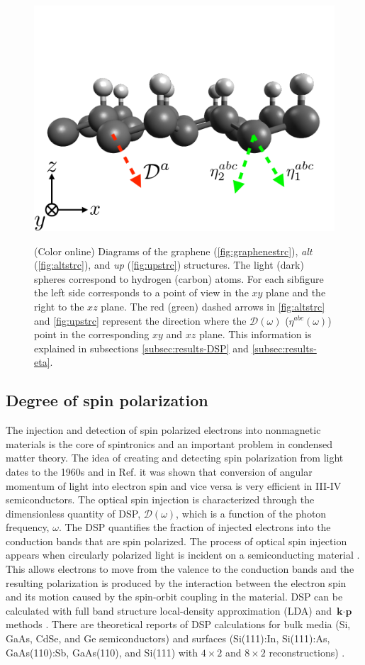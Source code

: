 \documentclass[pss]{wiley2sp} %
\begin{document}
\begin{figure}[t]
{ \includegraphics[width=0.49\linewidth]{strc/up-vec2}\label{fig:upstrc}}
\caption{(Color online) Diagrams of the graphene (\ref{fig:graphenestrc}), \emph{alt} (\ref{fig:altstrc}), and \emph{up} (\ref{fig:upstrc}) structures. The light (dark) spheres correspond to hydrogen (carbon) atoms. For each sibfigure the left side corresponds to a point of view in the $xy$ plane and the right to the $xz$ plane. The red (green) dashed arrows in \ref{fig:altstrc} and \ref{fig:upstrc} represent the direction where the $\mathcal{D}(\omega)$ ($\eta^{abc}(\omega)$) point in the corresponding $xy$ and $xz$ plane. This information is explained in subsections \ref{subsec:results-DSP} and \ref{subsec:results-eta}.\label{fig:structures}}
\end{figure}

\subsection{Degree of spin polarization}

The injection and detection of spin polarized electrons into nonmagnetic materials is the core of spintronics \cite{vzuticRMP04,fertRMP08} and an important  problem in condensed matter theory.
The idea of creating and detecting spin polarization from light dates to the 1960s \cite{LampelPRL68} and in Ref. \cite{dyakonovOO84} it was shown that conversion of angular momentum of light into electron spin and vice versa is very efficient in III-IV semiconductors. The optical spin injection is characterized through the dimensionless quantity of DSP, $\mathcal{D}(\omega)$, which is a function of the photon frequency, $\omega$. The DSP quantifies the fraction of injected electrons into the conduction bands that are spin polarized.
The process of optical spin injection appears when circularly polarized light is incident on a semiconducting material \cite{dyakonovOO84}. This allows electrons to move from the valence to the conduction bands and the resulting polarization is produced by the interaction between the electron spin and its motion caused by the spin-orbit coupling in the material. DSP can be calculated with full band structure local-density approximation (LDA) and $\textbf{k}\cdot\textbf{p}$ methods \cite{nastosPRB07,cabellosPRB09}. There are theoretical reports of DSP calculations for bulk media (Si, GaAs, CdSe, and Ge semiconductors) \cite{nastosPRB07,cabellosPRB09} and surfaces (Si(111):In, Si(111):As, GaAs(110):Sb, GaAs(110), and Si(111) with $4\times2$ and $8\times2$ reconstructions) \cite{mendozaPRB12,arzatePRB14}. 
\end{document}
